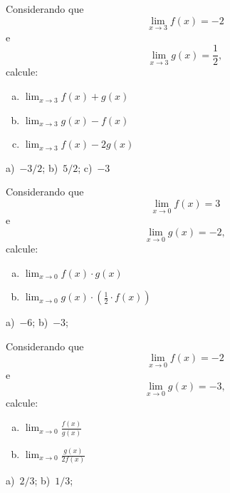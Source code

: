 \begin{exer}
  Considerando que
  \begin{equation}
    \lim_{x\to 3} f(x) = -2
  \end{equation}
  e
  \begin{equation}
    \lim_{x\to 3} g(x) = \frac{1}{2},
  \end{equation}
  calcule:
  \begin{enumerate}[a)]
  \item $\displaystyle\lim_{x\to 3} f(x)+g(x)$
  \item $\displaystyle\lim_{x\to 3} g(x)-f(x)$
  \item $\displaystyle\lim_{x\to 3} f(x)-2g(x)$
  \end{enumerate}
\end{exer}
\begin{resp}
  a)~$-3/2$; b)~$5/2$; c)~$-3$
\end{resp}

\begin{exer}
  Considerando que
  \begin{equation}
    \lim_{x\to 0} f(x) = 3
  \end{equation}
  e
  \begin{equation}
    \lim_{x\to 0} g(x) = -2,
  \end{equation}
  calcule:
  \begin{enumerate}[a)]
  \item $\displaystyle\lim_{x\to 0} f(x)\cdot g(x)$
  \item $\displaystyle\lim_{x\to 0} g(x)\cdot (\frac{1}{2}\cdot f(x))$
  \end{enumerate}
\end{exer}
\begin{resp}
  a)~$-6$; b)~$-3$;
\end{resp}

\begin{exer}
  Considerando que
  \begin{equation}
    \lim_{x\to 0} f(x) = -2
  \end{equation}
  e
  \begin{equation}
    \lim_{x\to 0} g(x) = -3,
  \end{equation}
  calcule:
  \begin{enumerate}[a)]
  \item $\displaystyle\lim_{x\to 0} \frac{f(x)}{g(x)}$
  \item $\displaystyle\lim_{x\to 0} \frac{g(x)}{2f(x)}$
  \end{enumerate}
\end{exer}
\begin{resp}
  a)~$2/3$; b)~$1/3$;
\end{resp}

